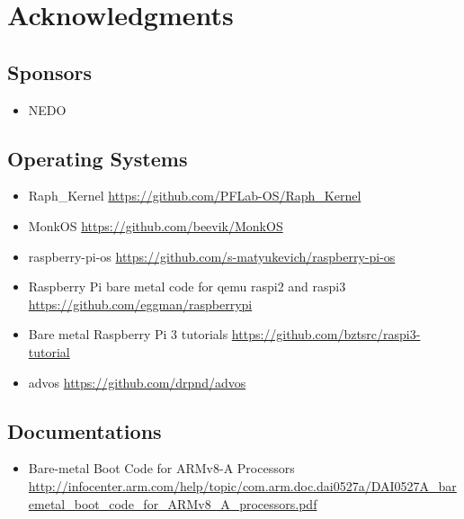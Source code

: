 \section{Acknowledgments}

\subsection{Sponsors}

\begin{itemize}
\item NEDO
\end{itemize}

\subsection{Operating Systems}

\begin{itemize}
\item Raph\_Kernel
  \url{https://github.com/PFLab-OS/Raph_Kernel}
\item MonkOS
  \url{https://github.com/beevik/MonkOS}
\item raspberry-pi-os
  \url{https://github.com/s-matyukevich/raspberry-pi-os}
\item Raspberry Pi bare metal code for qemu raspi2 and raspi3
  \url{https://github.com/eggman/raspberrypi}
\item Bare metal Raspberry Pi 3 tutorials
  \url{https://github.com/bztsrc/raspi3-tutorial}
\item advos
  \url{https://github.com/drpnd/advos}
\end{itemize}

\subsection{Documentations}

\begin{itemize}
\item Bare-metal Boot Code for ARMv8-A Processors
  \url{http://infocenter.arm.com/help/topic/com.arm.doc.dai0527a/DAI0527A_baremetal_boot_code_for_ARMv8_A_processors.pdf}
\end{itemize}

